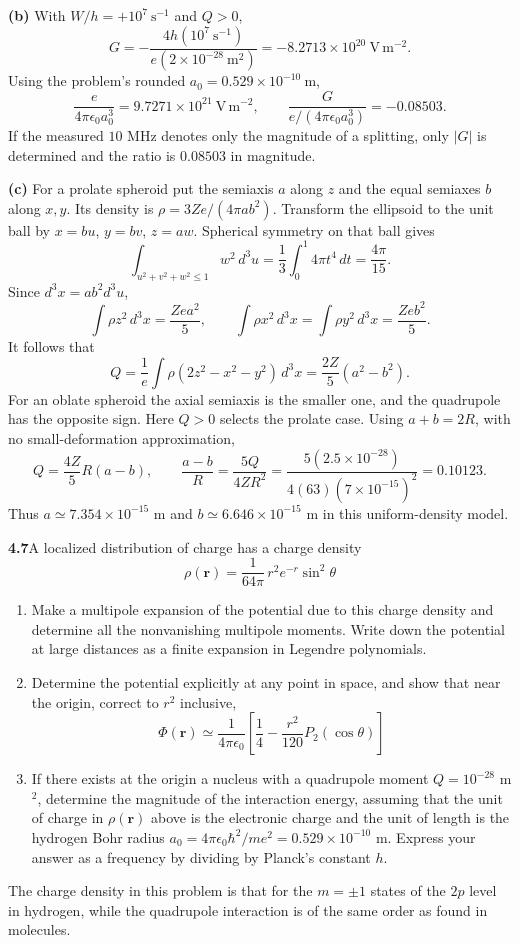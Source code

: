 \textbf{(b)} With $W/h=+10^7\ \mathrm{s}^{-1}$ and $Q>0$,
\[
G=-\frac{4h(10^7\ \mathrm{s}^{-1})}{e(2\times10^{-28}\ \mathrm{m}^2)}
=-8.2713\times10^{20}\ \mathrm{V\,m^{-2}}.
\]
Using the problem's rounded $a_0=0.529\times10^{-10}\ \mathrm m$,
\[
\frac{e}{4\pi\epsilon_0a_0^3}=9.7271\times10^{21}\ \mathrm{V\,m^{-2}},
\qquad
\boxed{\frac{G}{e/(4\pi\epsilon_0a_0^3)}=-0.08503.}
\]
If the measured $10$ MHz denotes only the magnitude of a splitting,
only $|G|$ is determined and the ratio is $0.08503$ in magnitude.

\textbf{(c)} For a prolate spheroid put the semiaxis $a$ along $z$
and the equal semiaxes $b$ along $x,y$. Its density is
$\rho=3Ze/(4\pi ab^2)$. Transform the ellipsoid to the unit ball by
$x=bu$, $y=bv$, $z=aw$. Spherical symmetry on that ball gives
\[
\int_{u^2+v^2+w^2\leq1}w^2\,d^3u
=\frac13\int_0^1 4\pi t^4\,dt=\frac{4\pi}{15}.
\]
Since $d^3x=ab^2d^3u$,
\[
\int\rho z^2\,d^3x=\frac{Ze a^2}{5},\qquad
\int\rho x^2\,d^3x=\int\rho y^2\,d^3x=\frac{Ze b^2}{5}.
\]
It follows that
\[
\boxed{Q=\frac1e\int\rho(2z^2-x^2-y^2)\,d^3x
=\frac{2Z}{5}(a^2-b^2).}
\]
For an oblate spheroid the axial semiaxis is the smaller one, and the
quadrupole has the opposite sign. Here $Q>0$ selects the prolate case.
Using $a+b=2R$, with no small-deformation approximation,
\[
Q=\frac{4Z}{5}R(a-b),\qquad
\boxed{\frac{a-b}{R}=\frac{5Q}{4ZR^2}
=\frac{5(2.5\times10^{-28})}{4(63)(7\times10^{-15})^2}
=0.10123.}
\]
Thus $a\simeq7.354\times10^{-15}$ m and
$b\simeq6.646\times10^{-15}$ m in this uniform-density model.

\par\bigskip
\noindent\textbf{4.7}\quad A localized distribution of charge has a charge density
\[
\rho(\mathbf{r})=\frac{1}{64\pi}\,r^{2}e^{-r}\sin^{2}\theta
\]
\begin{enumerate}
\item[(a)] Make a multipole expansion of the potential due to this charge density and determine all the nonvanishing multipole moments. Write down the potential at large distances as a finite expansion in Legendre polynomials.
\item[(b)] Determine the potential explicitly at any point in space, and show that near the origin, correct to $r^{2}$ inclusive,
\[
\Phi(\mathbf{r})\simeq\frac{1}{4\pi\epsilon_{0}}\left[\frac{1}{4}-\frac{r^{2}}{120}P_{2}(\cos\theta)\right]
\]
\item[(c)] If there exists at the origin a nucleus with a quadrupole moment $Q=10^{-28}$ m$^{2}$,  determine the magnitude of the interaction energy, assuming that the unit of charge in $\rho(\mathbf{r})$ above is the electronic charge and the unit of length is the hydrogen Bohr radius $a_{0}=4\pi\epsilon_{0}\hbar^{2}/me^{2}=0.529\times10^{-10}$ m. Express your answer as a frequency by dividing by Planck's constant $h$.
\end{enumerate}
The charge density in this problem is that for the $m=\pm1$ states of the $2p$ level in hydrogen, while the quadrupole interaction is of the same order as found in molecules.
\solution

